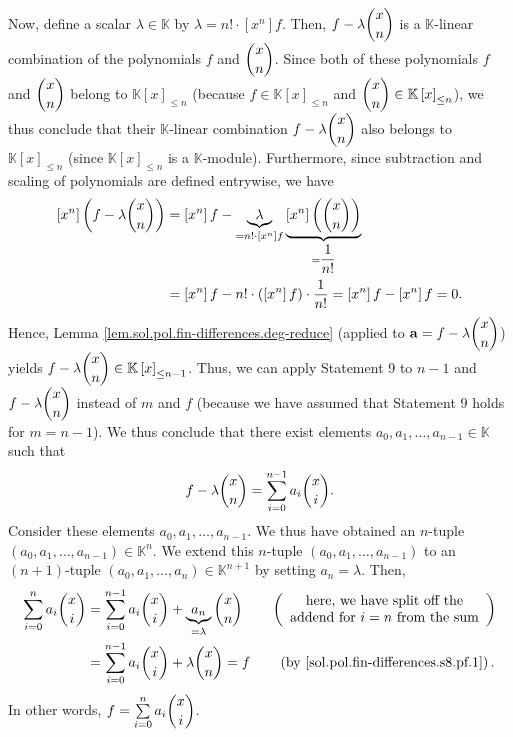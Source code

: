 \documentclass[paper=a4, fontsize=12pt]{scrartcl}%
\let\sumnonlimits\sum
\renewcommand{\sum}{\sumnonlimits\limits}
\theoremstyle{plainsl}
\theoremstyle{definition}
\theoremstyle{remark}
\begin{document}
Now, define a scalar $\lambda\in\mathbb{K}$ by $\lambda=n!\cdot\left[
x^{n}\right]  f$. Then, $f-\lambda\dbinom{x}{n}$ is a $\mathbb{K}$-linear
combination of the polynomials $f$ and $\dbinom{x}{n}$. Since both of these
polynomials $f$ and $\dbinom{x}{n}$ belong to $\mathbb{K}\left[  x\right]
_{\leq n}$ (because $f\in\mathbb{K}\left[  x\right]  _{\leq n}$ and
$\dbinom{x}{n}\in\mathbb{K}\left[  x\right]  _{\leq n}$), we thus conclude
that their $\mathbb{K}$-linear combination $f-\lambda\dbinom{x}{n}$ also
belongs to $\mathbb{K}\left[  x\right]  _{\leq n}$ (since $\mathbb{K}\left[
x\right]  _{\leq n}$ is a $\mathbb{K}$-module). Furthermore, since subtraction
and scaling of polynomials are defined entrywise, we have%
\begin{align*}
\left[  x^{n}\right]  \left(  f-\lambda\dbinom{x}{n}\right)   &  =\left[
x^{n}\right]  f-\underbrace{\lambda}_{=n!\cdot\left[  x^{n}\right]
f}\underbrace{\left[  x^{n}\right]  \left(  \dbinom{x}{n}\right)  }%
_{=\dfrac{1}{n!}}\\
&  =\left[  x^{n}\right]  f-n!\cdot\left(  \left[  x^{n}\right]  f\right)
\cdot\dfrac{1}{n!}=\left[  x^{n}\right]  f-\left[  x^{n}\right]  f=0.
\end{align*}
Hence, Lemma \ref{lem.sol.pol.fin-differences.deg-reduce} (applied to
$\mathbf{a}=f-\lambda\dbinom{x}{n}$) yields $f-\lambda\dbinom{x}{n}%
\in\mathbb{K}\left[  x\right]  _{\leq n-1}$. Thus, we can apply Statement 9
to $n-1$ and $f-\lambda\dbinom{x}{n}$ instead of $m$ and $f$ (because we have
assumed that Statement 9 holds for $m=n-1$). We thus conclude that there
exist elements $a_{0},a_{1},\ldots,a_{n-1}\in\mathbb{K}$ such that
\begin{equation}
f-\lambda\dbinom{x}{n}=\sum_{i=0}^{n-1}a_{i}\dbinom{x}{i}.
\label{sol.pol.fin-differences.s8.pf.1}%
\end{equation}
Consider these elements $a_{0},a_{1},\ldots,a_{n-1}$. We thus have obtained an
$n$-tuple $\left(  a_{0},a_{1},\ldots,a_{n-1}\right)  \in\mathbb{K}^{n}$. We
extend this $n$-tuple $\left(  a_{0},a_{1},\ldots,a_{n-1}\right)  $ to an
$\left(  n+1\right)  $-tuple $\left(  a_{0},a_{1},\ldots,a_{n}\right)
\in\mathbb{K}^{n+1}$ by setting $a_{n}=\lambda$. Then,%
\begin{align*}
\sum_{i=0}^{n}a_{i}\dbinom{x}{i}  &  =\sum_{i=0}^{n-1}a_{i}\dbinom{x}%
{i}+\underbrace{a_{n}}_{=\lambda}\dbinom{x}{n}\qquad\left(
\begin{array}
[c]{c}%
\text{here, we have split off the}\\
\text{addend for }i=n\text{ from the sum}%
\end{array}
\right) \\
&  =\sum_{i=0}^{n-1}a_{i}\dbinom{x}{i}+\lambda\dbinom{x}{n}=f\qquad\left(
\text{by \eqref{sol.pol.fin-differences.s8.pf.1}}\right)  .
\end{align*}
In other words, $f=\sum_{i=0}^{n}a_{i}\dbinom{x}{i}$.
\end{document}
